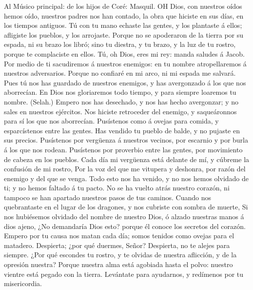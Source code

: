  Al Músico principal: de los hijos de Coré: Masquil. OH
Dios, con nuestros oídos hemos oído, nuestros padres nos han contado, la
obra que hiciste en sus días, en los tiempos antiguos.  Tú
con tu mano echaste las gentes, y los plantaste á ellos; afligiste los
pueblos, y los arrojaste.  Porque no se apoderaron de la
tierra por su espada, ni su brazo los libró; sino tu diestra, y tu
brazo, y la luz de tu rostro, porque te complaciste en ellos.
 Tú, oh Dios, eres mi rey: manda saludes á Jacob.
 Por medio de ti sacudiremos á nuestros enemigos: en tu
nombre atropellaremos á nuestros adversarios.  Porque no
confiaré en mi arco, ni mi espada me salvará.  Pues tú nos
has guardado de nuestros enemigos, y has avergonzado á los que nos
aborrecían.  En Dios nos gloriaremos todo tiempo, y para
siempre loaremos tu nombre. (Selah.)  Empero nos has
desechado, y nos has hecho avergonzar; y no sales en nuestros ejércitos.
 Nos hiciste retroceder del enemigo, y saqueáronnos para sí
los que nos aborrecían.  Pusístenos como á ovejas para
comida, y esparcístenos entre las gentes.  Has vendido tu
pueblo de balde, y no pujaste en sus precios.  Pusístenos
por vergüenza á nuestros vecinos, por escarnio y por burla á los que nos
rodean.  Pusístenos por proverbio entre las gentes, por
movimiento de cabeza en los pueblos.  Cada día mi vergüenza
está delante de mí, y cúbreme la confusión de mi rostro, 
Por la voz del que me vitupera y deshonra, por razón del enemigo y del
que se venga.  Todo esto nos ha venido, y no nos hemos
olvidado de ti; y no hemos faltado á tu pacto.  No se ha
vuelto atrás nuestro corazón, ni tampoco se han apartado nuestros pasos
de tus caminos.  Cuando nos quebrantaste en el lugar de los
dragones, y nos cubriste con sombra de muerte,  Si nos
hubiésemos olvidado del nombre de nuestro Dios, ó alzado nuestras manos
á dios ajeno,  ¿No demandaría Dios esto? porque él conoce
los secretos del corazón.  Empero por tu causa nos matan
cada día; somos tenidos como ovejas para el matadero. 
Despierta; ¿por qué duermes, Señor? Despierta, no te alejes para
siempre.  ¿Por qué escondes tu rostro, y te olvidas de
nuestra aflicción, y de la opresión nuestra?  Porque
nuestra alma está agobiada hasta el polvo: nuestro vientre está pegado
con la tierra.  Levántate para ayudarnos, y redímenos por
tu misericordia.

